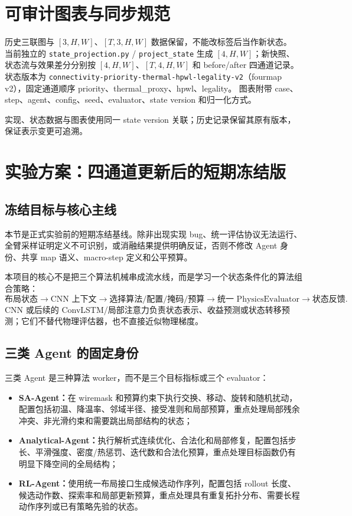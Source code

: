 \documentclass[UTF8,a4paper,11pt]{ctexart}
\newcommand{\code}[1]{\texttt{#1}}
\begin{document}
\section{可审计图表与同步规范}

历史三联图与 $[3,H,W]$、$[T,3,H,W]$ 数据保留，不能改标签后当作新状态。
当前独立的 \code{state\_projection.py} / \code{project\_state} 生成 $[4,H,W]$；新快照、状态流与效果差分分别按 $[4,H,W]$、$[T,4,H,W]$ 和 before/after 四通道记录。
状态版本为 \code{connectivity-priority-}\allowbreak\code{thermal-hpwl-legality-v2}（fourmap v2），固定通道顺序 priority、thermal\_proxy、hpwl、legality。
图表附带 case、step、agent、config、seed、evaluator、state version 和归一化方式。

实现、状态数据与图表使用同一 state version 关联；历史记录保留其原有版本，保证表示变更可追溯。

\section{实验方案：四通道更新后的短期冻结版}

\subsection{冻结目标与核心主线}

本节是正式实验前的短期冻结基线。除非出现实现 bug、统一评估协议无法运行、全臂采样证明定义不可识别，或消融结果提供明确反证，否则不修改 Agent 身份、共享 map 语义、macro-step 定义和公平预算。

本项目的核心不是把三个算法机械串成流水线，而是学习一个状态条件化的算法组合策略：
\[
\text{布局状态}\rightarrow\text{CNN 上下文}\rightarrow
\text{选择算法/配置/掩码/预算}\rightarrow
\text{统一 PhysicsEvaluator}\rightarrow\text{状态反馈}.
\]
CNN 或后续的 ConvLSTM/局部注意力负责状态表示、收益预测或状态转移预测；它们不替代物理评估器，也不直接近似物理梯度。

\subsection{三类 Agent 的固定身份}

三类 Agent 是三种算法 worker，而不是三个目标指标或三个 evaluator：

\begin{itemize}
    \item \textbf{SA-Agent：}在 wiremask 和预算约束下执行交换、移动、旋转和随机扰动，配置包括初温、降温率、邻域半径、接受准则和局部预算，重点处理局部残余冲突、非光滑约束和需要跳出局部结构的状态；
    \item \textbf{Analytical-Agent：}执行解析式连续优化、合法化和局部修复，配置包括步长、平滑强度、密度/热惩罚、迭代数和合法化预算，重点处理目标函数仍有明显下降空间的全局结构；
    \item \textbf{RL-Agent：}使用统一布局接口生成候选动作序列，配置包括 rollout 长度、候选动作数、探索率和局部更新预算，重点处理具有重复拓扑分布、需要长程动作序列或已有策略先验的状态。
\end{itemize}
\end{document}

